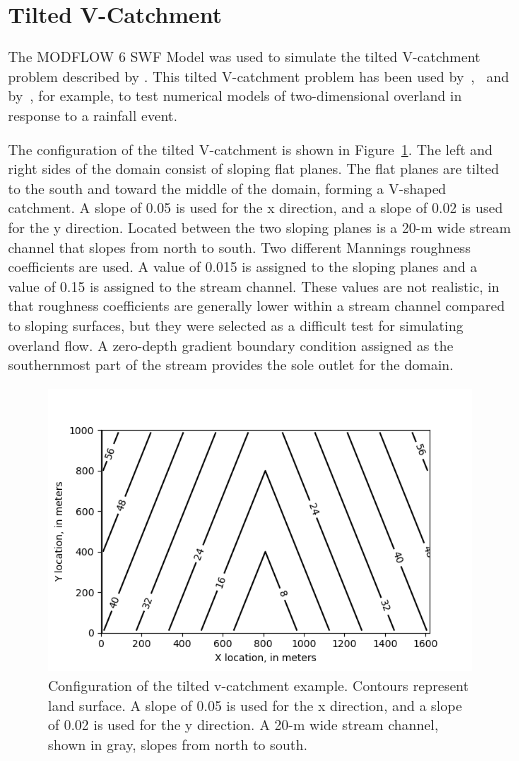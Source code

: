 \documentclass[fleqn]{article}
\begin{document}
\newpage
\subsection{Tilted V-Catchment}

The MODFLOW 6 SWF Model was used to simulate the tilted V-catchment problem described by \cite{digiammarco1996}.  This tilted V-catchment problem has been used by~\cite{VanderKwaak1999},~\cite{panday2004} and by~\cite{hughes2015}, for example, to test numerical models of two-dimensional overland in response to a rainfall event.

The configuration of the tilted V-catchment is shown in Figure~\ref{fig:vcatch-surface}.  The left and right sides of the domain consist of sloping flat planes.  The flat planes are tilted to the south and toward the middle of the domain, forming a V-shaped catchment.  A slope of 0.05 is used for the x direction, and a slope of 0.02 is used for the y direction.  Located between the two sloping planes is a 20-m wide stream channel that slopes from north to south.  Two different Mannings roughness coefficients are used.  A value of 0.015 is assigned to the sloping planes and a value of 0.15 is assigned to the stream channel.  These values are not realistic, in that roughness coefficients are generally lower within a stream channel compared to sloping surfaces, but they were selected as a difficult test for simulating overland flow.  A zero-depth gradient boundary condition assigned as the southernmost part of the stream provides the sole outlet for the domain.

\begin{figure}[h!tbp]
	\centering
	\includegraphics[scale=0.75]{figures/vcatch-surface.png}
	\caption[Configuration of the tilted v-catchment example.]{Configuration of the tilted v-catchment example.  Contours represent land surface.  A slope of 0.05 is used for the x direction, and a slope of 0.02 is used for the y direction.  A 20-m wide stream channel, shown in gray, slopes from north to south.}
	\label{fig:vcatch-surface}
\end{figure}
\end{document}
